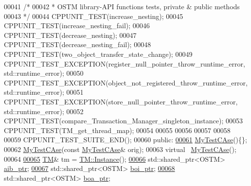 \begin{DoxyCode}
00041     \textcolor{comment}{/*}
00042 \textcolor{comment}{     * OSTM library-API functions tests, private & public methods}
00043 \textcolor{comment}{     */}
00044     CPPUNIT\_TEST(increase\_nesting);
00045     CPPUNIT\_TEST(increase\_nesting\_fail);
00046     CPPUNIT\_TEST(decrease\_nesting);
00047     CPPUNIT\_TEST(decrease\_nesting\_fail);
00048     CPPUNIT\_TEST(two\_object\_transfer\_state\_change);
00049     CPPUNIT\_TEST\_EXCEPTION(register\_null\_pointer\_throw\_runtime\_error, std::runtime\_error);
00050     CPPUNIT\_TEST\_EXCEPTION(object\_not\_registered\_throw\_runtime\_error, std::runtime\_error);
00051     CPPUNIT\_TEST\_EXCEPTION(store\_null\_pointer\_throw\_runtime\_error, std::runtime\_error);
00052     CPPUNIT\_TEST(compare\_Transaction\_Manager\_singleton\_instance);
00053     CPPUNIT\_TEST(TM\_get\_thread\_map);
00054    
00055     
00056     
00057             
00058 
00059     CPPUNIT\_TEST\_SUITE\_END();
00060 \textcolor{keyword}{public}:
\hypertarget{_my_test_c_ase_8h_source.tex_l00061}{}\hyperlink{class_my_test_c_ase_a17e7a9246f54f74dacf88f8d6556aa92_a17e7a9246f54f74dacf88f8d6556aa92}{00061}     \hyperlink{class_my_test_c_ase_a17e7a9246f54f74dacf88f8d6556aa92_a17e7a9246f54f74dacf88f8d6556aa92}{MyTestCAse}()\{\};
00062     \hyperlink{class_my_test_c_ase}{MyTestCAse}(\textcolor{keyword}{const} \hyperlink{class_my_test_c_ase}{MyTestCAse}& orig);
00063     \textcolor{keyword}{virtual} ~\hyperlink{class_my_test_c_ase}{MyTestCAse}();
00064 
\hypertarget{_my_test_c_ase_8h_source.tex_l00065}{}\hyperlink{class_my_test_c_ase_a422e6e5d4ddedea384be96031c89b72b_a422e6e5d4ddedea384be96031c89b72b}{00065}     \hyperlink{class_t_m}{TM}& tm = \hyperlink{class_t_m_a7ce5f35e0dae76df4fe116cf905bbe60_a7ce5f35e0dae76df4fe116cf905bbe60}{TM::Instance}();
\hypertarget{_my_test_c_ase_8h_source.tex_l00066}{}\hyperlink{class_my_test_c_ase_adad50e8278b64aa0321000b528e5362c_adad50e8278b64aa0321000b528e5362c}{00066}     std::shared\_ptr<OSTM> \hyperlink{class_my_test_c_ase_adad50e8278b64aa0321000b528e5362c_adad50e8278b64aa0321000b528e5362c}{aib\_ptr};
\hypertarget{_my_test_c_ase_8h_source.tex_l00067}{}\hyperlink{class_my_test_c_ase_a5554de9e3e6393a89c66c036c529720b_a5554de9e3e6393a89c66c036c529720b}{00067}     std::shared\_ptr<OSTM> \hyperlink{class_my_test_c_ase_a5554de9e3e6393a89c66c036c529720b_a5554de9e3e6393a89c66c036c529720b}{boi\_ptr};
\hypertarget{_my_test_c_ase_8h_source.tex_l00068}{}\hyperlink{class_my_test_c_ase_ae0b2db5d35e25b3139beeda0705494f0_ae0b2db5d35e25b3139beeda0705494f0}{00068}     std::shared\_ptr<OSTM> \hyperlink{class_my_test_c_ase_ae0b2db5d35e25b3139beeda0705494f0_ae0b2db5d35e25b3139beeda0705494f0}{boa\_ptr};

\end{DoxyCode}
